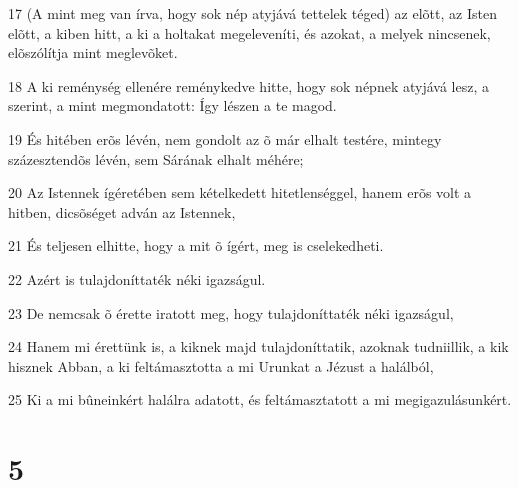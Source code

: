 \par 17 (A mint meg van írva, hogy sok nép atyjává tettelek téged) az elõtt, az Isten elõtt, a kiben hitt, a ki a holtakat megeleveníti, és azokat, a melyek nincsenek, elõszólítja mint meglevõket.
\par 18 A ki reménység ellenére reménykedve hitte, hogy sok népnek atyjává lesz, a szerint, a mint megmondatott: Így lészen a te magod.
\par 19 És hitében erõs lévén, nem gondolt az õ már elhalt testére, mintegy százesztendõs lévén, sem Sárának elhalt méhére;
\par 20 Az Istennek ígéretében sem kételkedett hitetlenséggel, hanem erõs volt a hitben, dicsõséget adván az Istennek,
\par 21 És teljesen elhitte, hogy a mit õ ígért, meg is cselekedheti.
\par 22 Azért is tulajdoníttaték néki igazságul.
\par 23 De nemcsak õ érette iratott meg, hogy tulajdoníttaték néki igazságul,
\par 24 Hanem mi érettünk is, a kiknek majd tulajdoníttatik, azoknak tudniillik, a kik hisznek Abban, a ki feltámasztotta a mi Urunkat a Jézust a halálból,
\par 25 Ki a mi bûneinkért halálra adatott, és feltámasztatott  a mi megigazulásunkért.

\chapter{5}

